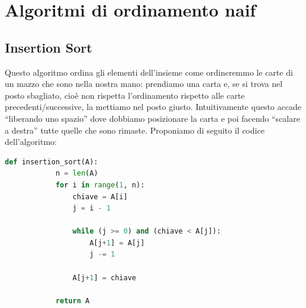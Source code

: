 \documentclass[12pt]{report}
\begin{document}
    \section{Algoritmi di ordinamento naif}
    \subsection{Insertion Sort}
    Questo algoritmo ordina gli elementi dell’insieme come ordineremmo le carte di un mazzo che sono nella nostra mano: prendiamo una carta e, se si trova nel posto sbagliato, cioè non rispetta l’ordinamento rispetto alle carte precedenti/successive, la mettiamo nel posto giusto. Intuitivamente questo accade “liberando uno spazio” dove dobbiamo posizionare la carta e poi facendo “scalare a destra” tutte quelle che sono rimaste.
    Proponiamo di seguito il codice dell’algoritmo:
    		
    \begin{lstlisting}[caption={Insertion Sort}, language=Python]
    	def insertion_sort(A):
    		n = len(A)
    		for i in range(1, n):
    			chiave = A[i]
    			j = i - 1
    			
    			while (j >= 0) and (chiave < A[j]):
    				A[j+1] = A[j]
    				j -= 1
    			
    			A[j+1] = chiave
    			
    		return A
    \end{lstlisting}
    		
\end{document}
